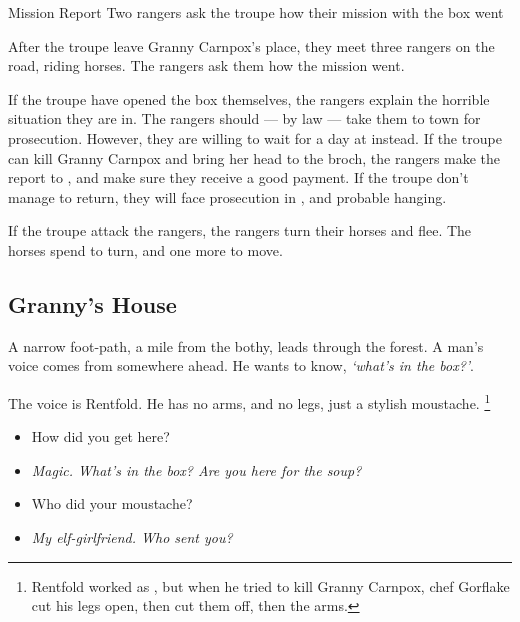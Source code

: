 \documentclass[10pt,twoside]{book}
\begin{document}
{Mission Report}%
{Two \glspl{ranger} ask the troupe how their mission with the box went}%

After the troupe leave Granny Carnpox's place, they meet three \glspl{ranger} on the road, riding horses.
The \glspl{ranger} ask them how the mission went.

\humansoldier[\npc{\T[3]\Hu\M\F}{\composeHumanName, \composeHumanName, \& \composeHumanName}]


If the troupe have opened the box themselves, the \glspl{ranger} explain the horrible situation they are in.
The \glspl{ranger} should --- by law --- take them to town for prosecution.
However, they are willing to wait for a day at  instead.
If the troupe can kill Granny Carnpox and bring her head to the \gls{broch}, the \glspl{ranger} make the report to , and make sure they receive a good payment.
If the troupe don't manage to return, they will face prosecution in , and probable hanging.

If the troupe attack the \glspl{ranger}, the \glspl{ranger} turn their horses and flee.
The horses spend  to turn, and one more to move.

\subsection{Granny's House}

\begin{boxtext}
  A narrow foot-path, a mile from the \gls{bothy}, leads through the forest.
  A man's voice comes from somewhere ahead.
  He wants to know, \textit{`what's in the box?'}.
\end{boxtext}

The voice is Rentfold.
He has no arms, and no legs, just a stylish moustache.%
\footnote{Rentfold worked as , but when he tried to kill Granny Carnpox, chef Gorflake cut his legs open, then cut them off, then the arms.}

\begin{itemize}
  \item\sf
  How did you get here?
  \item\it
  Magic.
  What's in the box?
  Are you here for the soup?
  \item\sf
  Who did your moustache?
  \item\it
  My elf-girlfriend.
  Who sent you?
\end{itemize}
\end{document}
